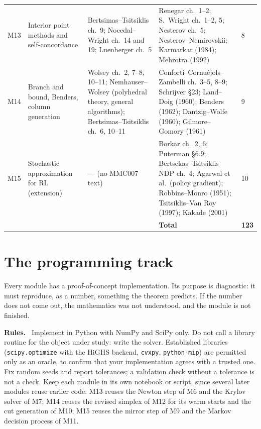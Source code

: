 \documentclass[11pt,a4paper]{article}
\newcommand{\mpart}[1]{\smallskip\noindent\textbf{#1}\ \ignorespaces}
\begin{document}
\begin{longtable}{@{}L{0.9cm} L{3.3cm} L{4.1cm} L{4.7cm} L{1.2cm}@{}}
M13 & Interior point methods and self-concordance
   & Bertsimas--Tsitsiklis ch.~9; Nocedal--Wright ch.~14 and 19; Luenberger ch.~5
   & Renegar ch.~1--2; S.~Wright ch.~1--2, 5; Nesterov ch.~5; Nesterov--Nemirovskii; Karmarkar (1984); Mehrotra (1992)
   & 8 \\

M14 & Branch and bound, Benders, column generation
   & Wolsey ch.~2, 7--8, 10--11; Nemhauser--Wolsey (polyhedral theory, general algorithms); Bertsimas--Tsitsiklis ch.~6, 10--11
   & Conforti--Cornu\'ejols--Zambelli ch.~3--5, 8--9; Schrijver \S 23; Land--Doig (1960); Benders (1962); Dantzig--Wolfe (1960); Gilmore--Gomory (1961)
   & 9 \\

M15 & Stochastic approximation for RL (extension)
   & --- (no MMC007 text)
   & Borkar ch.~2, 6; Puterman \S 6.9; Bertsekas--Tsitsiklis NDP ch.~4; Agarwal et al.\ (policy gradient); Robbins--Monro (1951); Tsitsiklis--Van Roy (1997); Kakade (2001)
   & 10 \\
\midrule
   &  &  & \textbf{Total} & \textbf{123} \\
\end{longtable}

\clearpage

\section{The programming track}

Every module has a proof-of-concept implementation. Its purpose is diagnostic: it must
reproduce, as a number, something the theorem predicts. If the number does not come out, the
mathematics was not understood, and the module is not finished.

\mpart{Rules.} Implement in Python with NumPy and SciPy only. Do not call a library routine
for the object under study: write the solver. Established libraries
(\texttt{scipy.optimize} with the HiGHS backend, \texttt{cvxpy}, \texttt{python-mip}) are
permitted only as an oracle, to confirm that your implementation agrees with a trusted one.
Fix random seeds and report tolerances; a validation check without a tolerance is not a
check. Keep each module in its own notebook or script, since several later modules reuse
earlier code: M13 reuses the Newton step of M6 and the Krylov solver of M7; M14 reuses the
revised simplex of M12 for its warm starts and the cut generation of M10; M15 reuses the
mirror step of M9 and the Markov decision process of M11.
\end{document}
